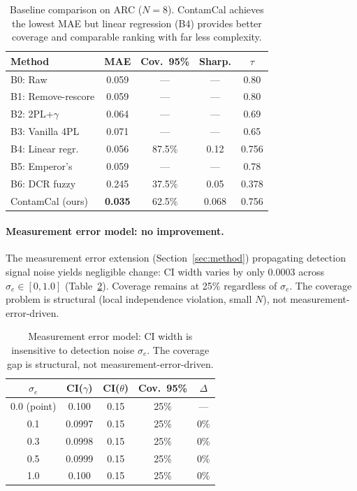 \documentclass[11pt,a4paper]{article}
\begin{document}
\begin{table}[t]
\centering
\small
\caption{Baseline comparison on ARC ($N=8$). ContamCal achieves the lowest MAE but linear regression (B4) provides better coverage and comparable ranking with far less complexity.}
\label{tab:baselines}
\begin{tabular}{lcccc}
\toprule
\textbf{Method} & \textbf{MAE} & \textbf{Cov.\ 95\%} & \textbf{Sharp.} & $\tau$ \\
\midrule
B0: Raw & 0.059 & --- & --- & 0.80 \\
B1: Remove-rescore & 0.059 & --- & --- & 0.80 \\
B2: 2PL+$\gamma$ & 0.064 & --- & --- & 0.69 \\
B3: Vanilla 4PL & 0.071 & --- & --- & 0.65 \\
B4: Linear regr. & 0.056 & 87.5\% & 0.12 & 0.756 \\
B5: Emperor's & 0.059 & --- & --- & 0.78 \\
B6: DCR fuzzy & 0.245 & 37.5\% & 0.05 & 0.378 \\
\midrule
ContamCal (ours) & \textbf{0.035} & 62.5\% & 0.068 & 0.756 \\
\bottomrule
\end{tabular}
\end{table}

\paragraph{Measurement error model: no improvement.}
The measurement error extension (Section~\ref{sec:method}) propagating detection signal noise yields negligible change: CI width varies by only 0.0003 across $\sigma_e \in [0, 1.0]$ (Table~\ref{tab:me-model}).
Coverage remains at 25\% regardless of $\sigma_e$.
The coverage problem is structural (local independence violation, small $N$), not measurement-error-driven.

\begin{table}[t]
\centering
\small
\caption{Measurement error model: CI width is insensitive to detection noise $\sigma_e$. The coverage gap is structural, not measurement-error-driven.}
\label{tab:me-model}
\begin{tabular}{ccccc}
\toprule
$\sigma_e$ & CI($\gamma$) & CI($\theta$) & Cov.\ 95\% & $\Delta$ \\
\midrule
0.0 (point) & 0.100 & 0.15 & 25\% & --- \\
0.1 & 0.0997 & 0.15 & 25\% & 0\% \\
0.3 & 0.0998 & 0.15 & 25\% & 0\% \\
0.5 & 0.0999 & 0.15 & 25\% & 0\% \\
1.0 & 0.100 & 0.15 & 25\% & 0\% \\
\bottomrule
\end{tabular}
\end{table}
\end{document}
